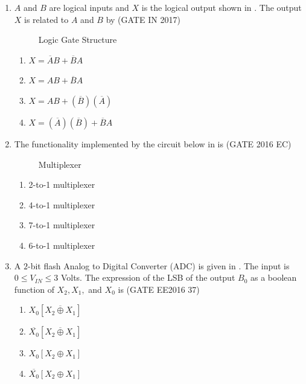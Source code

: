 \begin{enumerate}[label=\arabic*.,ref=\theenumi]
\begin{enumerate}
   \end{enumerate}
\item $A$ and $B$ are logical inputs and $X$ is the logical output shown in 
.
	The output $X$ is related to $A$ and $B$ by \hfill{(GATE IN 2017)}
\begin{figure}[!ht]
\centering
\resizebox{\columnwidth}{!}{%

	}
\caption{Logic Gate Structure}
\label{fig:gate_in_2017_30}
\end{figure}
\begin{enumerate}[label=\Alph*.]
\item $X = \overline{A}B + \overline{B}A$
\item $X = AB + \overline{B}A$
\item $X = AB + (\overline{B})(\overline{A})$
\item $X = (\overline{A})(\overline{B}) + \overline{B}A$
\end{enumerate}


\item The functionality implemented by the circuit below 
in
	is \hfill{(GATE 2016 EC)}

\begin{figure}[!ht]
\centering
\resizebox{\columnwidth}{!}{%

	}
\caption{Multiplexer}
\label{fig:gate_ec_2016_43}
\end{figure}

\begin{enumerate}[label=\Alph*.]
\item 2-to-1 multiplexer
\item 4-to-1 multiplexer
\item 7-to-1 multiplexer
\item 6-to-1 multiplexer
\end{enumerate}
\item A $2$-bit flash Analog to Digital Converter (ADC) is given in . The input is $0 \leq V_{IN} \leq 3$ Volts. The expression of the LSB of the output $B_0$ as a boolean function of $X_2,X_1,$ and $X_0$ is \hfill(GATE EE2016 37)
\begin{figure}[!ht]
\centering
\resizebox{\columnwidth}{!}{%

	}
\caption{}
\label{EE2016_37_fig1}
\end{figure}
\begin{enumerate}
\item $X_0 \left[ \overline {X_2 \oplus X_1} \right]$
\item $\overline {X_0} \left[ \overline {X_2 \oplus X_1} \right]$
\item $X_0 \left[ X_2 \oplus X_1 \right]$
\item $\overline{X_0} \left[ X_2 \oplus X_1 \right]$
\end{enumerate}


\end{enumerate}
